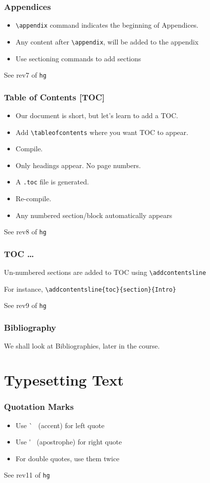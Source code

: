 \documentclass{beamer}
\newcommand{\typ}[1]{\lstinline{#1}}
\begin{document}
\begin{frame}[fragile]
  \frametitle{Appendices}
  \begin{itemize}
  \item \lstinline{\appendix} command indicates the beginning of
    Appendices. 
  \item Any content after \lstinline{\appendix}, will be added to the
    appendix 
  \item Use sectioning commands to add sections
  \end{itemize}
  \tiny See rev7 of \typ{hg}
\end{frame}

\begin{frame}[fragile]
  \frametitle{Table of Contents [TOC]}
  \begin{itemize}
  \item Our document is short, but let's learn to add a TOC.
  \item Add \lstinline{\tableofcontents} where you want TOC to
    appear.
  \item Compile. 
  \item Only headings appear. No page numbers. 
  \item A \lstinline{.toc} file is generated. 
  \item Re-compile.
  \item Any numbered section/block automatically appears
  \end{itemize}
  \tiny See rev8 of \typ{hg}
\end{frame}

\begin{frame}[fragile]
  \frametitle{TOC \ldots}
  \begin{itemize}
  \item Un-numbered sections are added to TOC using
    \lstinline{\addcontentsline}
  \item For instance,  \lstinline+\addcontentsline{toc}{section}{Intro}+
  \end{itemize}
  \tiny See rev9 of \typ{hg}
\end{frame}

\begin{frame}
  \frametitle{Bibliography}
  We shall look at Bibliographies, later in the course. 
\end{frame}

\section{Typesetting Text}
\begin{frame}[fragile]
  \frametitle{Quotation Marks}
  \begin{itemize}
  \item Use \`~ (accent) for left quote
  \item Use \'~ (apostrophe) for right quote
  \item For double quotes, use them twice
  \end{itemize}
  \tiny See rev11 of \typ{hg}
\end{frame}
\end{document}
